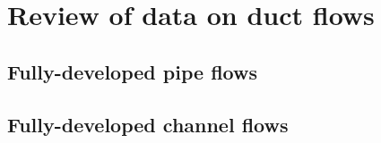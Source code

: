 %
\chapter{Review of data on duct flows}

\section{Fully-developed pipe flows}

\begin{figure}
    \centering
    
    
\end{figure}

\begin{figure}
    \centering
    
    
\end{figure}

\section{Fully-developed channel flows}

\begin{figure}
    \centering
    
    
\end{figure}

\begin{figure}
    \centering
    
    
\end{figure}
